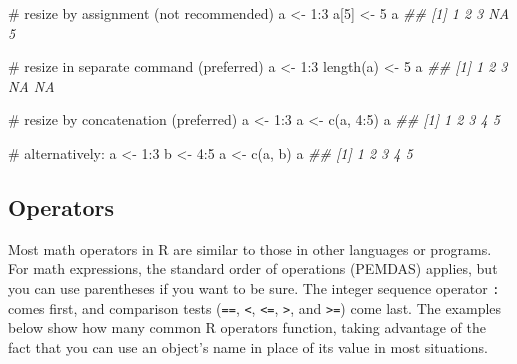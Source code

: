 \documentclass[
  13,
  letterpaper,
]{report}
\newenvironment{Shaded}{\begin{snugshade}}{\end{snugshade}}
\newcommand{\CommentTok}[1]{\textcolor[rgb]{0.37,0.37,0.37}{#1}}
\newcommand{\DecValTok}[1]{\textcolor[rgb]{0.68,0.00,0.00}{#1}}
\newcommand{\DocumentationTok}[1]{\textcolor[rgb]{0.37,0.37,0.37}{\textit{#1}}}
\newcommand{\FunctionTok}[1]{\textcolor[rgb]{0.28,0.35,0.67}{#1}}
\newcommand{\NormalTok}[1]{\textcolor[rgb]{0.00,0.23,0.31}{#1}}
\newcommand{\OtherTok}[1]{\textcolor[rgb]{0.00,0.23,0.31}{#1}}
\newcommand{\SpecialCharTok}[1]{\textcolor[rgb]{0.37,0.37,0.37}{#1}}
\begin{document}
\begin{Shaded}
\begin{Highlighting}[]
\CommentTok{\# resize by assignment (not recommended)}
\NormalTok{a }\OtherTok{\textless{}{-}} \DecValTok{1}\SpecialCharTok{:}\DecValTok{3}
\NormalTok{a[}\DecValTok{5}\NormalTok{] }\OtherTok{\textless{}{-}} \DecValTok{5}
\NormalTok{a}
\DocumentationTok{\#\# [1]  1  2  3 NA  5}

\CommentTok{\# resize in separate command (preferred)}
\NormalTok{a }\OtherTok{\textless{}{-}} \DecValTok{1}\SpecialCharTok{:}\DecValTok{3}
\FunctionTok{length}\NormalTok{(a) }\OtherTok{\textless{}{-}} \DecValTok{5}
\NormalTok{a}
\DocumentationTok{\#\# [1]  1  2  3 NA NA}

\CommentTok{\# resize by concatenation (preferred)}
\NormalTok{a }\OtherTok{\textless{}{-}} \DecValTok{1}\SpecialCharTok{:}\DecValTok{3}
\NormalTok{a }\OtherTok{\textless{}{-}} \FunctionTok{c}\NormalTok{(a, }\DecValTok{4}\SpecialCharTok{:}\DecValTok{5}\NormalTok{)}
\NormalTok{a}
\DocumentationTok{\#\# [1] 1 2 3 4 5}

\CommentTok{\# alternatively:}
\NormalTok{a }\OtherTok{\textless{}{-}} \DecValTok{1}\SpecialCharTok{:}\DecValTok{3}
\NormalTok{b }\OtherTok{\textless{}{-}} \DecValTok{4}\SpecialCharTok{:}\DecValTok{5}
\NormalTok{a }\OtherTok{\textless{}{-}} \FunctionTok{c}\NormalTok{(a, b)}
\NormalTok{a}
\DocumentationTok{\#\# [1] 1 2 3 4 5}
\end{Highlighting}
\end{Shaded}

\subsection{Operators}\label{sec-02-syn-ops}

Most math operators in R are similar to those in other languages or
programs. For math expressions, the standard order of operations
(PEMDAS) applies, but you can use parentheses if you want to be sure.
The integer sequence operator \texttt{:} comes first, and comparison
tests (\texttt{==}, \texttt{\textless{}}, \texttt{\textless{}=},
\texttt{\textgreater{}}, and \texttt{\textgreater{}=}) come last. The
examples below show how many common R operators function, taking
advantage of the fact that you can use an object's name in place of its
value in most situations.
\end{document}
